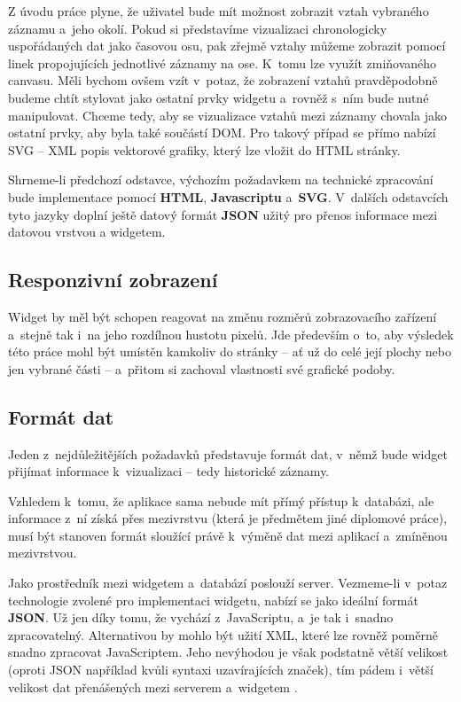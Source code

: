 			Z úvodu práce plyne, že uživatel bude mít možnost zobrazit vztah vybraného záznamu a~jeho okolí. Pokud si představíme vizualizaci chronologicky uspořáda\-ných dat jako časovou osu, pak zřejmě vztahy můžeme zobrazit pomocí linek propojujících jednotlivé záznamy na ose. K~tomu lze využít zmiňovaného canvasu. Měli bychom ovšem vzít v~potaz, že zobrazení vztahů pravděpodobně budeme chtít stylovat jako ostatní prvky widgetu a~rovněž s~ním bude nutné manipulovat. Chceme tedy, aby se vizualizace vztahů mezi záznamy chovala jako ostatní prvky, aby byla také součástí DOM. Pro takový případ se přímo nabízí SVG -- XML popis vektorové grafiky, který lze vložit do HTML stránky.

			Shrneme-li předchozí odstavce, výchozím požadavkem na technické zpracování bude implementace pomocí {\bf HTML}, {\bf Javascriptu} a~{\bf SVG}. V~dalších odstavcích tyto jazyky doplní ještě datový formát {\bf JSON} užitý pro přenos informace mezi datovou vrstvou a widgetem.
		
		\subsection*{Responzivní zobrazení}
			\label{responzivni-zobrazeni}
			Widget by měl být schopen reagovat na změnu rozměrů zobrazovacího zařízení a~stejně tak i~na jeho rozdílnou hustotu pixelů. Jde především o~to, aby výsledek této práce mohl být umístěn kamkoliv do stránky -- ať už do celé její plochy nebo jen vybrané části -- a~přitom si zachoval vlastnosti své grafické podoby. 
		
		\subsection*{Formát dat}	
			\label{format-dat}
			Jeden z~nejdůležitějších požadavků představuje formát dat, v~němž bude widget přijímat informace k~vizualizaci -- tedy historické záznamy. 
			
			Vzhledem k~tomu, že aplikace sama nebude mít přímý přístup k~databázi, ale informace z~ní získá přes mezivrstvu (která je předmětem jiné diplomové práce), musí být stanoven formát sloužící právě k~výměně dat mezi aplikací a~zmíněnou mezivrstvou. 
			
			Jako prostředník mezi widgetem a~databází poslouží server. Vezmeme-li v~potaz technologie zvolené pro implementaci widgetu, nabízí se jako ideální formát {\bf JSON}. Už jen díky tomu, že vychází z~JavaScriptu, a~je tak i~snadno zpracovatelný. Alternativou by mohlo být užití XML, které lze rovněž poměrně snadno zpracovat JavaScriptem. Jeho nevýhodou je však podstatně větší velikost (oproti JSON například kvůli syntaxi uzavírajících značek), tím pádem i~větší velikost dat přenášených mezi serverem a~widgetem \cite{kogent-2008}.
			
